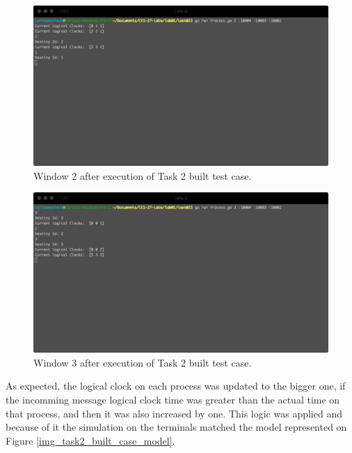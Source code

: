 \documentclass[a4paper, 11pt]{article}
\begin{document}
\begin{figure}[h]
  \begin{center}
  \includegraphics[width=4.5in]{./imgs/task2_buit_test_window2.png}
  \caption{Window 2 after execution of Task 2 built test case.}
  \label{img_task2_built_case_window2}
  \end{center}
\end{figure}

\begin{figure}[h]
  \begin{center}
  \includegraphics[width=4.5in]{./imgs/task2_buit_test_window3.png}
  \caption{Window 3 after execution of Task 2 built test case.}
  \label{img_task2_built_case_window3}
  \end{center}
\end{figure}

As expected, the logical clock on each process was updated to the bigger one, if the incomming message logical clock time was greater than the actual time on that process, and then it was also increased by one. This logic was applied and because of it the simulation on the terminals matched the model represented on Figure \ref{img_task2_built_case_model}.


% 
% 
\end{document}
